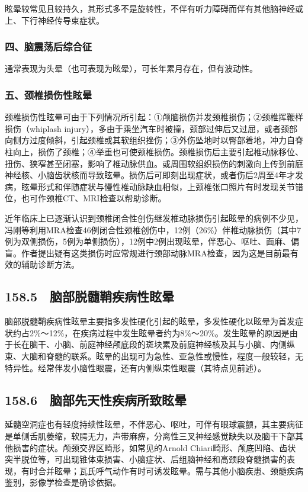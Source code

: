 眩晕较常见且较持久，其形式多不是旋转性，不伴有听力障碍而伴有其他脑神经或上、下行神经传导束症状。

\subsubsection{四、脑震荡后综合征}

通常表现为头晕（也可表现为眩晕），可长年累月存在，但有波动性。

\subsubsection{五、颈椎损伤性眩晕}

颈椎损伤性眩晕可由于下列情况所引起：①颅脑损伤并发颈椎损伤；②颈椎挥鞭样损伤（whiplash
injury），多由于乘坐汽车时被撞，颈部过伸后又过屈，或者颈部向侧方过度倾斜，引起颈椎或其软组织挫伤；③外伤坠地时以臀部着地，冲力自脊柱向上，损伤了颈椎；④举重也可使颈椎损伤。颈椎损伤后主要引起椎动脉移位、扭伤、狭窄甚至闭塞，影响了椎动脉供血。或周围软组织损伤的刺激向上传到前庭神经核、小脑齿状核而导致眩晕。损伤后可即刻出现症状，或者伤后2周至4年才发病，眩晕形式和伴随症状与慢性椎动脉缺血相似，上颈椎张口照片有时发现关节错位，也可作颈椎CT、MRI检查以帮助诊断。

近年临床上已逐渐认识到颈椎闭合性创伤继发椎动脉损伤引起眩晕的病例不少见，冯刚等利用MRA检查46例闭合性颈椎创伤中，12例（26\%）伴椎动脉损伤（其中7例为双侧损伤，5例为单侧损伤），12例中2例出现眩晕，伴恶心、呕吐、面麻、偏盲。作者提出疑有这类损伤时应常规进行颈部动脉MRA检查，因为这是目前最有效的辅助诊断方法。

\subsection{158.5　脑部脱髓鞘疾病性眩晕}

脑部脱髓鞘疾病性眩晕主要指多发性硬化引起的眩晕，多发性硬化以眩晕为首发症状约占2\%～12\%，在疾病过程中发生眩晕者约为8\%～20\%。发生眩晕的原因是由于长在脑干、小脑、前庭神经颅底段的斑块累及前庭神经核及其与小脑、内侧纵束、大脑和脊髓的联系。眩晕的出现可为急性、亚急性或慢性，程度一般较轻，无特异性。经常伴发小脑性眼震，还有内侧纵束性眼震（其特点见前述）。

\subsection{158.6　脑部先天性疾病所致眩晕}

延髓空洞症也有轻度持续性眩晕，不伴恶心、呕吐，可伴有眼球震颤，其主要病征是单侧舌肌萎缩，软腭无力，声带麻痹，分离性三叉神经感觉缺失以及脑干下部其他损害的症状。颅颈交界区畸形，如常见的Arnold
Chiari畸形、颅底凹陷、齿状突半脱位等，可出现锥体束损害、小脑症状、后组脑神经和高颈段脊髓损害的表现，有时合并眩晕；瓦氏呼气动作有时可诱发眩晕。需与其他小脑疾患、颈髓疾病鉴别，影像学检查是确诊依据。

